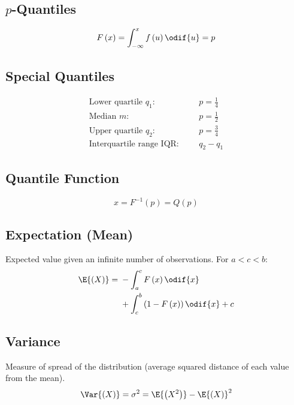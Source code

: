 \documentclass{article}
\begin{document}
\begin{multicols}{3}
        \subsection{\texorpdfstring{\(p\)}{p}-Quantiles}
        \begin{equation*}
            F\left( x \right) = \int_{-\infty}^x f\left( u \right) \odif{u} = p
        \end{equation*}
        \subsection{Special Quantiles}
        \begin{align*}
            \text{Lower quartile \(q_1\):}  &  &  & p = \frac{1}{4} \\
            \text{Median \(m\):}            &  &  & p = \frac{1}{2} \\
            \text{Upper quartile \(q_2\):}  &  &  & p = \frac{3}{4} \\
            \text{Interquartile range IQR:} &  &  & q_2 - q_1
        \end{align*}
        \subsection{Quantile Function}
        \begin{equation*}
            x = F^{-1}\left( p \right) = Q\left( p \right)
        \end{equation*}
        \subsection{Expectation (Mean)}
        Expected value given an infinite number of observations. For \(a < c < b\):
        \begin{equation*}
            \E{\left(X\right)} = \begin{aligned}[t]
                 & -\int_{a}^c F\left( x \right) \odif{x}                     \\
                 & + \int_c^b \left(1 - F\left( x \right)\right) \odif{x} + c
            \end{aligned}
        \end{equation*}
        \subsection{Variance}
        Measure of spread of the distribution (average squared distance of each value from the mean).
        \begin{equation*}
            \Var{\left( X \right)} = \sigma^2 = \E{\left( X^2 \right)} - \E{\left( X \right)}^2
        \end{equation*}

\end{multicols}
\end{document}
